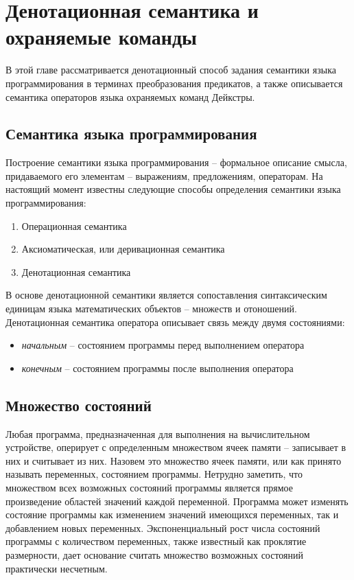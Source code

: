 \chapter{Денотационная семантика и охраняемые команды} \label{ch1}

В этой главе рассматривается денотационный способ задания семантики 
языка программирования в терминах преобразования предикатов,
а также описывается семантика операторов языка охраняемых команд Дейкстры.

\section{Семантика языка программирования}
Построение семантики языка программирования -- формальное описание смысла, придаваемого его
элементам -- выражениям, предложениям, операторам. На настоящий момент известны
следующие способы определения семантики языка программирования:
\begin{enumerate}
	\item Операционная семантика
	\item Аксиоматическая, или деривационная семантика
	\item Денотационная семантика
\end{enumerate}


В основе денотационной семантики является сопоставления синтаксическим единицам языка
математических объектов -- множеств и отоношений. Денотационная семантика оператора 
описывает связь между двумя состояниями: 
\begin{itemize}
	\item \textit{начальным} -- состоянием программы перед выполнением оператора
	\item \textit{конечным} -- состоянием программы после выполнения оператора
\end{itemize}

\section{Множество состояний}
Любая программа, предназначенная для выполнения на вычислительном устройстве, оперирует
с определенным множеством ячеек памяти -- записывает в них и считывает из них. Назовем это множество
ячеек памяти, или как принято называть переменных, состоянием программы. Нетрудно заметить,
что множеством всех возможных состояний программы является прямое произведение областей значений
каждой переменной. Программа может изменять состояние программы как изменением значений
имеющихся переменных, так и добавлением новых переменных. Экспоненциальный рост числа состояний 
программы с количеством переменных, также известный как проклятие размерности, дает основание 
считать множество возможных состояний практически несчетным.

